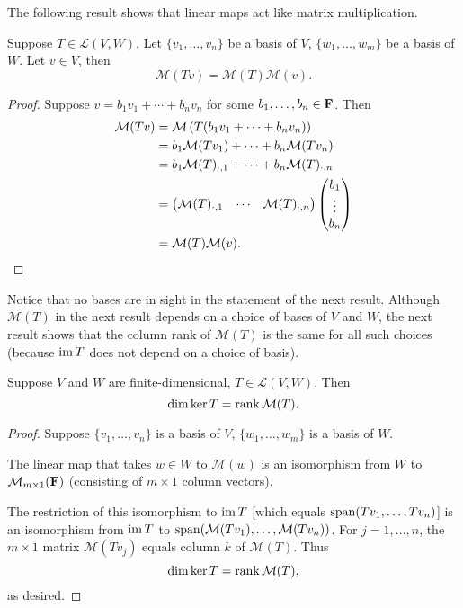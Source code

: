 The following result shows that linear maps act like matrix multiplication.

\begin{lemma}
Suppose $T\in\mathcal{L}(V,W)$. Let $\{v_1,\dots,v_n\}$ be a basis of $V$, $\{w_1,\dots,w_m\}$ be a basis of $W$. Let $v\in V$, then
\[\mathcal{M}(Tv)=\mathcal{M}(T)\mathcal{M}(v).\]
\end{lemma}

\begin{proof}
Suppose $v=b_1v_1+\cdots+b_nv_n$ for some $b_1,\dots,b_n\in\mathbf F$. Then
\begin{align*}
\mathcal{M}(Tv)&=\mathcal{M}\left(T(b_1v_1+\cdots+b_nv_n)\right)\\
&=b_1\mathcal{M}(Tv_1)+\cdots+b_n\mathcal{M}(Tv_n)\\
&=b_1\mathcal{M}(T)_{\cdot,1}+\cdots+b_n\mathcal{M}(T)_{\cdot,n}\\
&=\begin{pmatrix}
\mathcal{M}(T)_{\cdot,1}&\cdots&\mathcal{M}(T)_{\cdot,n}
\end{pmatrix}\begin{pmatrix}
b_1\\\vdots\\b_n
\end{pmatrix}\\
&=\mathcal{M}(T)\mathcal{M}(v).
\end{align*}
\end{proof}

Notice that no bases are in sight in the statement of the next result. Although $\mathcal{M}(T)$ in the next result depends on a choice of bases of $V$ and $W$, the next result shows that the column rank of $\mathcal{M}(T)$ is the same for all such choices (because $\operatorname{im} T$ does not depend on a choice of basis).

\begin{proposition}
Suppose $V$ and $W$ are finite-dimensional, $T\in\mathcal{L}(V,W)$. Then
\[\dim\ker T=\rank\mathcal{M}(T).\]
\end{proposition}

\begin{proof}
Suppose $\{v_1,\dots,v_n\}$ is a basis of $V$, $\{w_1,\dots,w_m\}$ is a basis of $W$. 

The linear map that takes $w\in W$ to $\mathcal{M}(w)$ is an isomorphism from $W$ to $\mathcal{M}_{m\times1}(\mathbf F)$ (consisting of $m\times1$ column vectors).

The restriction of this isomorphism to $\operatorname{im} T$ [which equals $\operatorname{span}(Tv_1,\dots,Tv_n)$] is an isomorphism from $\operatorname{im} T$ to $\operatorname{span}(\mathcal{M}(Tv_1),\dots,\mathcal{M}(Tv_n))$. For $j=1,\dots,n$, the $m\times1$ matrix $\mathcal{M}(Tv_j)$ equals column $k$ of $\mathcal{M}(T)$. Thus
\[\dim\ker T=\rank\mathcal{M}(T),\]
as desired.
\end{proof}
\pagebreak

